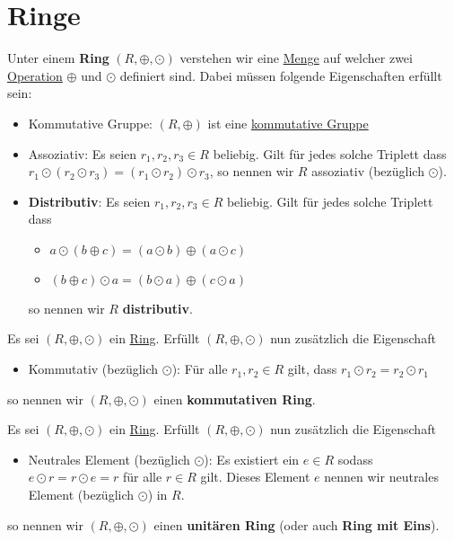 \documentclass[../../main.tex]{subfiles}
\begin{document}
		\section{Ringe}
		\begin{definition}
			\label{def:Ring}
			\label{def:distributiv}
			Unter einem \textbf{Ring} $(R, \oplus, \odot)$ verstehen wir eine \hyperref[def:Menge]{Menge} auf welcher zwei \hyperref[def:Operation]{Operation} $\oplus$ und $\odot$ definiert sind. Dabei müssen folgende Eigenschaften erfüllt sein: 
			\begin{itemize}
				\item Kommutative Gruppe: $(R, \oplus)$ ist eine \hyperref[def:kommutativeGruppe]{kommutative Gruppe}
				\item Assoziativ: Es seien $r_1, r_2, r_3 \in R$ beliebig. Gilt für jedes solche Triplett dass $r_1 \odot (r_2 \odot r_3) = (r_1 \odot r_2) \odot r_3$, so nennen wir $R$ assoziativ (bezüglich $\odot$). 
				\item \textbf{Distributiv}: Es seien $r_1, r_2, r_3 \in R$ beliebig. Gilt für jedes solche Triplett dass 
				\begin{itemize}
					\item $a \odot (b \oplus c) = (a \odot b) \oplus (a \odot c)$
					\item $(b \oplus c) \odot a = (b \odot a) \oplus (c \odot a)$
				\end{itemize}
				so nennen wir $R$ \textbf{distributiv}.
			\end{itemize}
		\end{definition}
	
		\begin{definition}
			\label{def:kommutativerRing}
			Es sei $(R, \oplus, \odot)$ ein \hyperref[def:Ring]{Ring}. Erfüllt $(R, \oplus, \odot)$ nun zusätzlich die Eigenschaft 
			\begin{itemize}
				\item Kommutativ (bezüglich $\odot$): Für alle $r_1,r_2 \in R$ gilt, dass $r_1 \odot r_2 = r_2 \odot r_1$
			\end{itemize}
			so nennen wir $(R, \oplus, \odot)$ einen \textbf{kommutativen Ring}.
		\end{definition}		
		
		\begin{definition}
			\label{def:unitärerRing}
			\label{def:RingMitEins}
			Es sei $(R, \oplus, \odot)$ ein \hyperref[def:Ring]{Ring}. Erfüllt $(R, \oplus, \odot)$ nun zusätzlich die Eigenschaft
			\begin{itemize}
				\item Neutrales Element (bezüglich $\odot$): Es existiert ein $e \in R$ sodass $e \odot r = r \odot e = r$ für alle $r\in R$ gilt. Dieses Element $e$ nennen wir neutrales Element (bezüglich $\odot$) in $R$.
			\end{itemize}
			so nennen wir $(R, \oplus, \odot)$ einen \textbf{unitären Ring} (oder auch \textbf{Ring mit Eins}).
		\end{definition}
	
\end{document}
